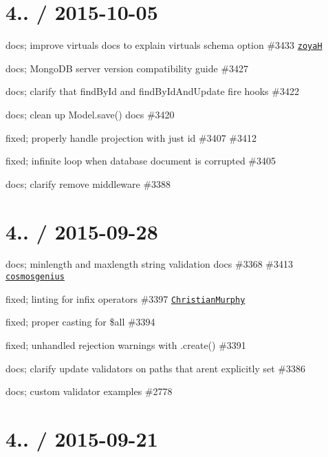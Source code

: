 \section*{4.. / 2015-\/10-\/05 }


\begin{DoxyItemize}
\item docs; improve virtuals docs to explain virtuals schema option \#3433 \href{https://github.com/zoyaH}{\tt zoyaH}
\item docs; Mongo\+DB server version compatibility guide \#3427
\item docs; clarify that find\+By\+Id and find\+By\+Id\+And\+Update fire hooks \#3422
\item docs; clean up Model.\+save() docs \#3420
\item fixed; properly handle projection with just id \#3407 \#3412
\item fixed; infinite loop when database document is corrupted \#3405
\item docs; clarify remove middleware \#3388
\end{DoxyItemize}

\section*{4.. / 2015-\/09-\/28 }


\begin{DoxyItemize}
\item docs; minlength and maxlength string validation docs \#3368 \#3413 \href{https://github.com/cosmosgenius}{\tt cosmosgenius}
\item fixed; linting for infix operators \#3397 \href{https://github.com/ChristianMurphy}{\tt Christian\+Murphy}
\item fixed; proper casting for \$all \#3394
\item fixed; unhandled rejection warnings with .create() \#3391
\item docs; clarify update validators on paths that aren\textquotesingle{}t explicitly set \#3386
\item docs; custom validator examples \#2778
\end{DoxyItemize}

\section*{4.. / 2015-\/09-\/21 }


